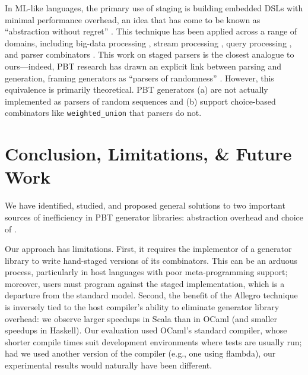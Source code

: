 \documentclass[acmsmall]{acmart}
\theoremstyle{definition}
\begin{document}
In ML-like languages, the primary use of staging is building embedded DSLs
with minimal performance overhead, an idea that has come to be known as ``abstraction without regret''
\cite{lms,parreaux17,parreauxthesis, sheard99, trattdsl}.
This technique has been applied across a range of domains, including
big-data processing \cite{jet12}, stream processing \cite{moller20,strymonas},
query processing \cite{rhyme}, and parser combinators \cite{sspc, staged-parsers, krishnaswami19, flap}.
This work on staged parsers is the closest analogue to ours---indeed, PBT research has drawn an explicit link between parsing and generation, framing generators
as ``parsers of randomness'' \cite{goldsteinParsingRandomness2022}.
However, this equivalence is primarily theoretical. PBT generators (a)
are not actually implemented as parsers
of random sequences and (b) support choice-based combinators like \texttt{weighted\_union} that parsers do not.


\section{Conclusion, Limitations, \& Future Work}
\label{section:concl}
We have identified, studied, and proposed general solutions to two
important sources of inefficiency in PBT generator libraries: abstraction
overhead and choice of \rand{}.

Our approach has limitations. First, it requires the implementor of a generator 
library to write hand-staged versions of its combinators. This can be an 
arduous process, particularly in host languages with poor meta-programming 
support; moreover, users must program against the staged implementation, 
which is a departure from the standard model. Second, the benefit of the 
Allegro technique is inversely tied to the host compiler’s ability to 
eliminate generator library overhead: we observe larger speedups in Scala 
than in OCaml (and smaller speedups in Haskell). Our evaluation used OCaml’s 
standard compiler, whose shorter compile times suit development environments 
where tests are usually run; had we used another version of the compiler 
(e.g., one using flambda\cite{ocaml-flambda}), our experimental results would naturally have 
been different.
\end{document}
